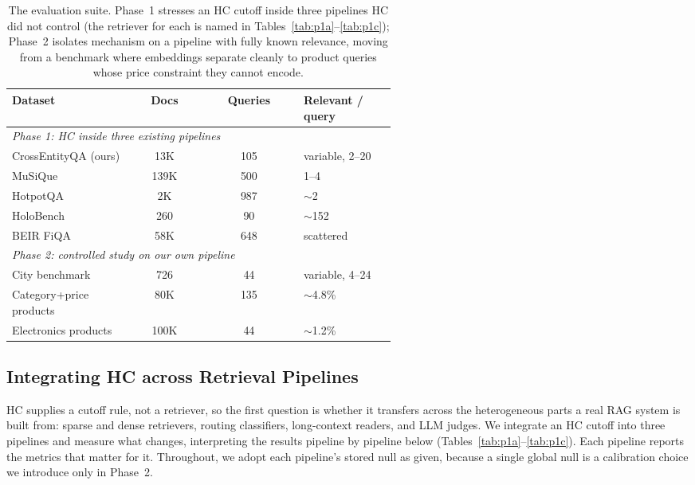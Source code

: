 \documentclass[letterpaper]{article} %
\begin{document}
\begin{table}[t]
\centering\small
\setlength{\extrarowheight}{1pt}
\begin{tabular}{|p{0.32\linewidth}|c|c|p{0.24\linewidth}|}
\hline
\textbf{Dataset} & \textbf{Docs} & \textbf{Queries} & \textbf{Relevant / query} \\
\hline
\multicolumn{4}{|l|}{\emph{Phase 1: HC inside three existing pipelines}}\\
\hline
CrossEntityQA (ours) & 13K & 105 & variable, 2--20 \\
\hline
MuSiQue & 139K & 500 & 1--4 \\
\hline
HotpotQA & 2K & 987 & $\sim$2 \\
\hline
HoloBench & 260 & 90 & $\sim$152 \\
\hline
BEIR FiQA & 58K & 648 & scattered \\
\hline
\multicolumn{4}{|l|}{\emph{Phase 2: controlled study on our own pipeline}}\\
\hline
City benchmark & 726 & 44 & variable, 4--24 \\
\hline
Category+price products & 80K & 135 & $\sim$4.8\% \\
\hline
Electronics products & 100K & 44 & $\sim$1.2\% \\
\hline
\end{tabular}
\caption{The evaluation suite. Phase~1 stresses an HC cutoff inside
three pipelines HC did not control (the retriever for each is named in
Tables~\ref{tab:p1a}--\ref{tab:p1c}); Phase~2 isolates mechanism on a
pipeline with fully known relevance, moving from a benchmark where
embeddings separate cleanly to product queries whose price constraint
they cannot encode.}
\label{tab:datasets}
\end{table}

\subsection{Integrating HC across Retrieval Pipelines}
\label{sec:phase1}
HC supplies a cutoff rule, not a retriever, so the first question is
whether it transfers across the heterogeneous parts a real RAG system is
built from: sparse and dense retrievers, routing classifiers,
long-context readers, and LLM judges. We integrate an HC cutoff into
three pipelines and measure what changes, interpreting the results
pipeline by pipeline below (Tables~\ref{tab:p1a}--\ref{tab:p1c}). Each
pipeline reports the metrics that matter for it. Throughout, we adopt
each pipeline's stored null as given, because a single global null is a
calibration choice we introduce only in Phase~2.
\end{document}
